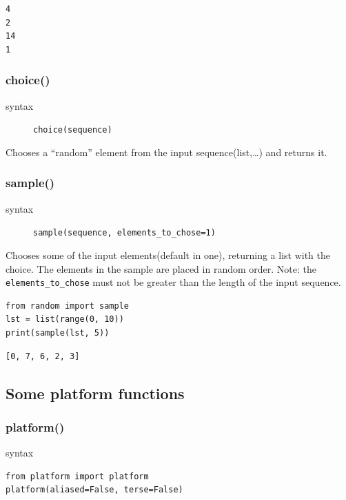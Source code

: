 \documentclass[11pt]{article}
\begin{document}
\begin{verbatim}
4
2
14
1
\end{verbatim}

\subsubsection{choice()}
\label{sec:orgfc81458}
\begin{description}
\item[{syntax}] \texttt{choice(sequence)}
\end{description}
Chooses a “random” element from the input sequence(list,\ldots{}) and
returns it.
\subsubsection{sample()}
\label{sec:org3f0233b}
\begin{description}
\item[{syntax}] \texttt{sample(sequence, elements\_to\_chose=1)}
\end{description}
Chooses some of the input elements(default in one), returning a list with the
choice. The elements in the sample are placed in random order. Note:
the \texttt{elements\_to\_chose} must not be greater than the length of the input
sequence.


\begin{verbatim}
from random import sample
lst = list(range(0, 10))
print(sample(lst, 5))
\end{verbatim}

\begin{verbatim}
[0, 7, 6, 2, 3]
\end{verbatim}


\newpage

\subsection{Some platform functions}
\label{sec:org8cf7373}
\subsubsection{platform()}
\label{sec:org1790eda}
\begin{description}
\item[{syntax}] 
\end{description}
\begin{verbatim}
from platform import platform
platform(aliased=False, terse=False)
\end{verbatim}
\end{document}
